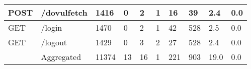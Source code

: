 \begin{table*}[h]
\begin{tabular}{|l|l|l|l|l|l|l|l|l|l|}
    POST                                  & /dovulfetch                        & 1416                                      & 0                                      & 2                                          & 1                                      & 16                                     & 39                                                 & 2.4                               & 0.0                                      \\ \hline
    GET                                   & /login                             & 1470                                      & 0                                      & 2                                          & 1                                      & 42                                     & 528                                                & 2.5                               & 0.0                                      \\ \hline
    GET                                   & /logout                            & 1429                                      & 0                                      & 3                                          & 2                                      & 27                                     & 528                                                & 2.4                               & 0.0                                      \\ \hline
                                          & Aggregated                         & 11374                                     & 13                                     & 16                                         & 1                                      & 221                                    & 903                                                & 19.0                              & 0.0                                      \\ \hline
    \end{tabular}
  \end{table*}